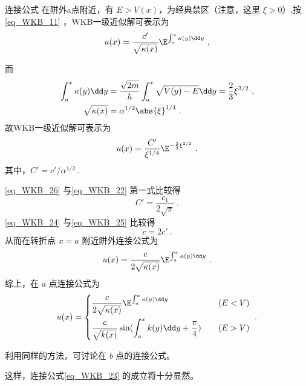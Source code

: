 \begin{example}{连接公式}
在阱外a点附近，有 $E>V(x)$，为经典禁区（注意，这里 $\xi>0$）,按\autoref{eq_WKB_11} ，WKB一级近似解可表示为
\begin{equation}
u(x)=\frac{c'}{\sqrt{\kappa(x)}}\E^{\int_a^x\kappa(y)\dd y}~,
\end{equation}


而
\begin{equation}
\begin{aligned}
\int_a^x\kappa(y)\dd y&=
\frac{\sqrt{2m}}{\hbar}\int_a^x\sqrt{V(y)-E}\dd y=\frac{2}{3}\xi^{3/2}~,
\\
\sqrt{\kappa(x)}
&=
\alpha^{1/2}\abs{\xi}^{1/4}~.
\end{aligned}
\end{equation}
故WKB一级近似解可表示为
\begin{equation}\label{eq_WKB_26}
u(x)=\frac{C'}{\xi^{1/4}}\E^{-\frac{2}{3}\xi^{3/2}}~.
\end{equation}
其中，$C'=c'/\alpha^{1/2}~.$

\autoref{eq_WKB_26}  与\autoref{eq_WKB_22} 第一式比较得
\begin{equation}\label{eq_WKB_24}
C'=\frac{c_1}{2\sqrt{\pi}}~.
\end{equation}
\autoref{eq_WKB_24} 与\autoref{eq_WKB_25} 比较得
\begin{equation}
c=2c'~.
\end{equation}
从而在转折点 $x=a$ 附近阱外连接公式为
\begin{equation}
u(x)=\frac{c}{2\sqrt{\kappa(x)}}\E^{\int_a^x\kappa(y)\dd y}~.
\end{equation}
综上，在 $a$ 点连接公式为
\begin{equation}
u(x)=\left\{\begin{aligned}
&\frac{c}{2\sqrt{\kappa(x)}}\E^{\int_a^x\kappa(y)\dd y} &\quad(E<V)\\
&\frac{c}{\sqrt{k(x)}}\sin(\int_a^x k(y)\dd y+\frac{\pi}{4})&\quad(E>V)
\end{aligned}\right.~.
\end{equation}

利用同样的方法，可讨论在 $b$ 点的连接公式。
\end{example}

这样，连接公式\autoref{eq_WKB_23} 的成立将十分显然。

